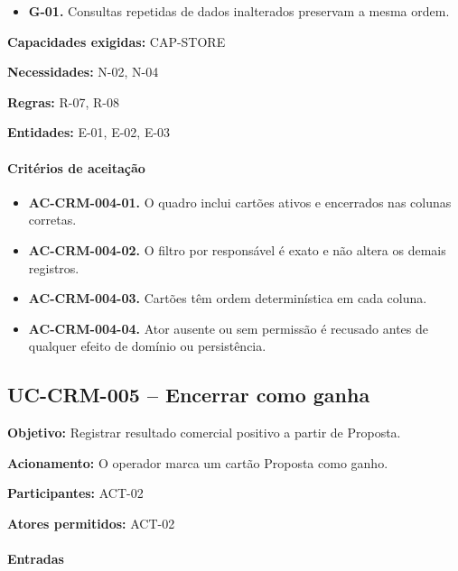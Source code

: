 \documentclass[10pt,a4paper]{article}
\begin{document}
\begin{itemize}

\item \textbf{G-01.} Consultas repetidas de dados inalterados preservam a mesma ordem.

\end{itemize}

\textbf{Capacidades exigidas:} CAP-STORE

\textbf{Necessidades:} N-02, N-04

\textbf{Regras:} R-07, R-08

\textbf{Entidades:} E-01, E-02, E-03

\paragraph{Critérios de aceitação}

\begin{itemize}

\item \textbf{AC-CRM-004-01.} O quadro inclui cartões ativos e encerrados nas colunas corretas.

\item \textbf{AC-CRM-004-02.} O filtro por responsável é exato e não altera os demais registros.

\item \textbf{AC-CRM-004-03.} Cartões têm ordem determinística em cada coluna.

\item \textbf{AC-CRM-004-04.} Ator ausente ou sem permissão é recusado antes de qualquer efeito de domínio ou persistência.

\end{itemize}

\subsection{UC-CRM-005 -- Encerrar como ganha}

\textbf{Objetivo:} Registrar resultado comercial positivo a partir de Proposta.

\textbf{Acionamento:} O operador marca um cartão Proposta como ganho.

\textbf{Participantes:} ACT-02

\textbf{Atores permitidos:} ACT-02

\paragraph{Entradas}
\end{document}
